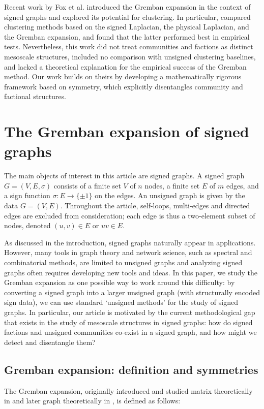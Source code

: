 \documentclass[reprint,onecolumn]{article}
\newcommand{\1}{\mathbb{1}}
\newcommand{\0}{\mathbf{0}}
\begin{document}
Recent work by Fox et al. \cite{fox2017numerical,fox2018investigation} introduced the Gremban expansion in the context of signed graphs and explored its potential for clustering. In particular, \cite{fox2018investigation} compared clustering methods based on the signed Laplacian, the physical Laplacian, and the Gremban expansion, and found that the latter performed best in empirical tests. 
Nevertheless, this work did not treat communities and factions as distinct mesoscale structures, included no comparison with unsigned clustering baselines, and lacked a theoretical explanation for the empirical success of the Gremban method. Our work builds on theirs by developing a mathematically rigorous framework based on symmetry, which explicitly disentangles community and factional structures.
%
\section{The Gremban expansion of signed graphs}\label{sec:gremban_combinatorial}

The main objects of interest in this article are signed graphs. A signed graph $G=(V,E,\sigma)$ consists of a finite set $V$ of $n$ nodes, a finite set $E$ of $m$ edges, and a sign function $\sigma:E\rightarrow\{\pm 1\}$ on the edges. An unsigned graph is given by the data $G=(V,E)$. Throughout the article, self-loops, multi-edges and directed edges are excluded from consideration; each edge is thus a two-element subset of nodes, denoted $(u,v)\in E$ or $uv\in E$.

As discussed in the introduction, signed graphs naturally appear in applications. However, many tools in graph theory and network science, such as spectral and combinatorial methods, are limited to unsigned graphs and analyzing signed graphs often requires developing new tools and ideas. In this paper, we study the Gremban expansion as one possible way to work around this difficulty: by converting a signed graph into a larger unsigned graph (with structurally encoded sign data), we can use standard `unsigned methods' for the study of signed graphs. In particular, our article is motivated by the current methodological gap that exists in the study of mesoscale structures in signed graphs: how do signed factions and unsigned communities co-exist in a signed graph, and how might we detect and disentangle them?
%
\subsection{Gremban expansion: definition and symmetries}
The Gremban expansion, originally introduced and studied matrix theoretically in \cite{gremban1996combinatorial} and later graph theoretically in \cite{fox2017numerical}, is defined as follows:
\end{document}
